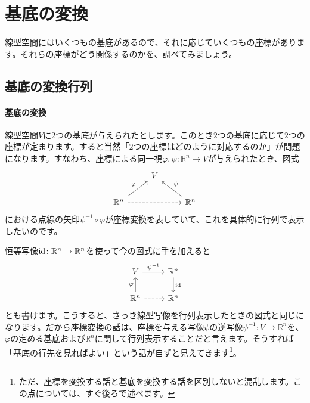 \section{基底の変換}

線型空間にはいくつもの基底があるので、それに応じていくつもの座標があります。それらの座標がどう関係するのかを、調べてみましょう。

\subsection{基底の変換行列}

\paragraph{基底の変換} 線型空間$V$に$2$つの基底が与えられたとします。このとき$2$つの基底に応じて$2$つの座標が定まります。すると当然「$2$つの座標はどのように対応するのか」が問題になります。すなわち、座標による同一視$\varphi, \psi\colon\mathbb{R}^n\rightarrow V$が与えられたとき、図式
\[
\begin{tikzcd}
& V & \\
\mathbb{R}^n \arrow[dashed]{rr} \arrow{ur}{\varphi} & & \mathbb{R}^n \arrow{ul}[swap]{\psi}
\end{tikzcd}
\]
における点線の矢印$\psi^{-1}\circ\varphi$が座標変換を表していて、これを具体的に行列で表示したいのです。

恒等写像$\operatorname{id}\colon\mathbb{R}^n\rightarrow\mathbb{R}^n$を使って今の図式に手を加えると
\[
\begin{tikzcd}
V \arrow{r}{\psi^{-1}} & \mathbb{R}^n \arrow{d}{\id} \\
\mathbb{R}^n \arrow{u}{\varphi} \arrow[dashed]{r} & \mathbb{R}^n
\end{tikzcd}
\]
とも書けます。こうすると、さっき線型写像を行列表示したときの図式と同じになります。だから座標変換の話は、座標を与える写像$\psi$の逆写像$\psi^{-1}\colon V\rightarrow \mathbb{R}^n$を、$\varphi$の定める基底および$\mathbb{R}^n$に関して行列表示することだと言えます。そうすれば「基底の行先を見ればよい」という話が自ずと見えてきます\footnote{ただ、座標を変換する話と基底を変換する話を区別しないと混乱します。この点については、すぐ後ろで述べます。}。

